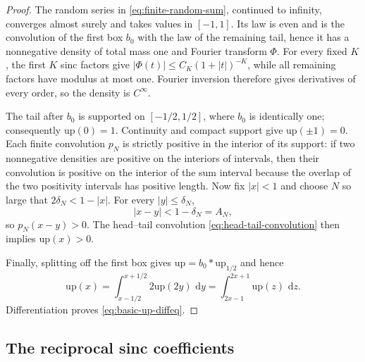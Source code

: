 \documentclass[11pt,oneside]{article}
\numberwithin{equation}{section}
\theoremstyle{definition}
\theoremstyle{remark}
\newcommand{\upf}{\mathrm{up}}
\newcommand{\dd}{\,\mathrm{d}}
\begin{document}
\begin{proof}
The random series in \eqref{eq:finite-random-sum}, continued to infinity,
converges almost surely and takes values in $[-1,1]$.  Its law is even and is the
convolution of the first box $b_0$ with the law of the remaining tail, hence it
has a nonnegative density of total mass one and Fourier transform $\Phi$.
For every fixed $K$, the first $K$ sinc factors give
$|\Phi(t)|\le C_K(1+|t|)^{-K}$, while all remaining factors have modulus at most
one.  Fourier inversion therefore gives derivatives of every order, so the
density is $C^\infty$.

The tail after $b_0$ is supported on $[-1/2,1/2]$, where $b_0$ is identically
one; consequently $\upf(0)=1$.  Continuity and compact support give
$\upf(\pm1)=0$.  Each finite convolution $p_N$ is strictly positive in the
interior of its support: if two nonnegative densities are positive on the
interiors of intervals, then their convolution is positive on the interior of
the sum interval because the overlap of the two positivity intervals has
positive length.  Now fix $|x|<1$ and choose $N$ so large that
$2\delta_N<1-|x|$.  For every $|y|\le\delta_N$,
\[
 |x-y|<1-\delta_N=A_N,
\]
so $p_N(x-y)>0$.  The head--tail convolution
\eqref{eq:head-tail-convolution} then implies $\upf(x)>0$.

Finally, splitting off the first box gives
$\upf=b_0*\upf_{1/2}$ and hence
\[
 \upf(x)=\int_{x-1/2}^{x+1/2}2\upf(2y)\,\dd y
        =\int_{2x-1}^{2x+1}\upf(z)\,\dd z.
\]
Differentiation proves \eqref{eq:basic-up-diffeq}.
\end{proof}

\subsection{The reciprocal sinc coefficients}
\end{document}
